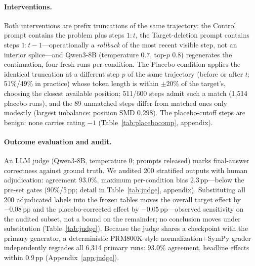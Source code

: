 \documentclass[11pt]{article}
\begin{document}
\paragraph{Interventions.}
Both interventions are prefix truncations of the same trajectory: the Control prompt contains the problem plus steps $1{:}t$, the Target-deletion prompt contains steps $1{:}t{-}1$---operationally a \emph{rollback} of the most recent visible step, not an interior splice---and Qwen3-8B (temperature $0.7$, top-$p$ $0.8$) regenerates the continuation, four fresh runs per condition. The Placebo condition applies the identical truncation at a different step $p$ of the same trajectory (before or after $t$; 51\%/49\% in practice) whose token length is within $\pm 20\%$ of the target's, choosing the closest available position; 511/600 steps admit such a match (1{,}514 placebo runs), and the 89 unmatched steps differ from matched ones only modestly (largest imbalance: position SMD $0.298$). The placebo-cutoff steps are benign: none carries rating $-1$ (Table~\ref{tab:placebocomp}, appendix).

\paragraph{Outcome evaluation and audit.}
An LLM judge (Qwen3-8B, temperature 0; prompts released) marks final-answer correctness against ground truth. We audited 200 stratified outputs with human adjudication: agreement 93.0\%, maximum per-condition bias $2.3$\,pp---below the pre-set gates (90\%/5\,pp; detail in Table~\ref{tab:judge}, appendix). Substituting all 200 adjudicated labels into the frozen tables moves the overall target effect by $-0.08$\,pp and the placebo-corrected effect by $-0.05$\,pp---observed sensitivity on the audited subset, not a bound on the remainder; no conclusion moves under substitution (Table~\ref{tab:judge}). Because the judge shares a checkpoint with the primary generator, a deterministic PRM800K-style normalization$+$SymPy grader independently regrades all 6{,}314 primary runs: 93.0\% agreement, headline effects within $0.9$\,pp (Appendix~\ref{app:judge}).
\end{document}
